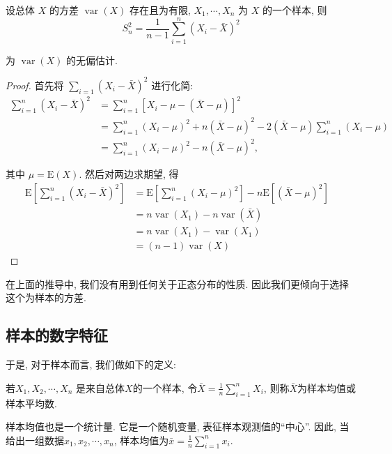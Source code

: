 \begin{theorem}
    设总体 $X$ 的方差 $\operatorname{var}(X)$ 存在且为有限, $X_1, \cdots, X_n$ 为 $X$ 的一个样本, 则
$$
S_n^2=\frac{1}{n-1} \sum_{i=1}^n\left(X_i-\bar{X}\right)^2
$$

为 $\operatorname{var}(X)$ 的无偏估计.
\end{theorem}

\begin{proof}
    首先将 $\sum_{i=1}\left(X_i-\bar{X}\right)^2$ 进行化简:
$$
\begin{aligned}
\sum_{i=1}^n\left(X_i-\bar{X}\right)^2&=\sum_{i=1}^n\left[X_i-\mu-(\bar{X}-\mu)\right]^2 & \\
& =\sum_{i=1}^n\left(X_i-\mu\right)^2+n(\bar{X}-\mu)^2-2(\bar{X}-\mu) \sum_{i=1}^n\left(X_i-\mu\right) \\
& =\sum_{i=1}^n\left(X_i-\mu\right)^2-n(\bar{X}-\mu)^2,
\end{aligned}
$$

其中 $\mu=\mathrm{E}(X)$. 然后对两边求期望, 得
$$
\begin{aligned}
\mathrm{E}\left[\sum_{i=1}^n\left(X_i-\bar{X}\right)^2\right]&=\mathrm{E}\left[\sum_{i=1}^n\left(X_i-\mu\right)^2\right]-n \mathrm{E}\left[(\bar{X}-\mu)^2\right] \\
&=n \operatorname{var}\left(X_1\right)-n \operatorname{var}(\bar{X})&\\
&=n \operatorname{var}\left(X_1\right)-\operatorname{var}\left(X_1\right) \\
&=(n-1) \operatorname{var}(X)
\end{aligned}
$$
\end{proof}

在上面的推导中, 我们没有用到任何关于正态分布的性质. 因此我们更倾向于选择这个为样本的方差. 

\subsection{样本的数字特征}

于是, 对于样本而言, 我们做如下的定义: 

\begin{definition}
    若$X_1, X_2, \cdots, X_n$ 是来自总体$X$的一个样本, 令$\bar X = \frac 1n \sum_{i=1}^{n}X_i$, 则称$\bar X$为样本均值或样本平均数. 
\end{definition}

样本均值也是一个统计量. 它是一个随机变量, 表征样本观测值的``中心''. 因此, 当给出一组数据$x_1, x_2, \cdots, x_n$, 样本均值为$\bar x=\frac 1n \sum_{i=1}^n x_i$.

